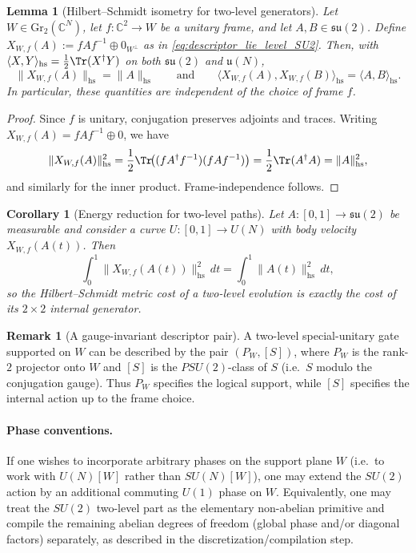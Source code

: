 \documentclass{article}%
\newtheorem{lemma}[theorem]{Lemma}
\newtheorem{corollary}[theorem]{Corollary}
\theoremstyle{definition}
\newtheorem{remark}[theorem]{Remark}
\numberwithin{equation}{section}
\newcommand{\C}{\mathbb{C}}
\newcommand{\Gr}{\mathrm{Gr}}
\begin{document}
\begin{lemma}[Hilbert--Schmidt isometry for two-level generators]
\label{lem:HS_norm_two_level_generator}
Let $W\in\Gr_2(\C^N)$, let $f:\C^2\to W$ be a unitary frame, and let $A,B\in\mathfrak{su}(2)$.
Define $X_{W,f}(A):=fAf^{-1}\oplus 0_{W^\perp}$ as in \eqref{eq:descriptor_lie_level_SU2}. Then, with
$\langle X,Y\rangle_{\mathrm{hs}}=\tfrac12\Tr(X^\dagger Y)$ on both $\mathfrak{su}(2)$ and
$\mathfrak{u}(N)$,
\begin{equation}\label{eq:HS_norm_preservation}
\|X_{W,f}(A)\|_{\mathrm{hs}}=\|A\|_{\mathrm{hs}}
\qquad\text{and}\qquad
\langle X_{W,f}(A),X_{W,f}(B)\rangle_{\mathrm{hs}}=\langle A,B\rangle_{\mathrm{hs}}.
\end{equation}
In particular, these quantities are independent of the choice of frame $f$.
\end{lemma}

\begin{proof}
Since $f$ is unitary, conjugation preserves adjoints and traces. Writing
$X_{W,f}(A)=fAf^{-1}\oplus 0$, we have
\[
\|X_{W,f}(A)\|_{\mathrm{hs}}^2
=\frac12\Tr\!\big((fA^\dagger f^{-1})(fAf^{-1})\big)
=\frac12\Tr(A^\dagger A)
=\|A\|_{\mathrm{hs}}^2,
\]
and similarly for the inner product. Frame-independence follows.
\end{proof}

\begin{corollary}[Energy reduction for two-level paths]\label{cor:energy_reduction_two_level}
Let $A:[0,1]\to\mathfrak{su}(2)$ be measurable and consider a curve $U:[0,1]\to U(N)$ with body
velocity $X_{W,f}(A(t))$. Then
\[
\int_0^1\|X_{W,f}(A(t))\|_{\mathrm{hs}}^2\,dt
=\int_0^1\|A(t)\|_{\mathrm{hs}}^2\,dt,
\]
so the Hilbert--Schmidt metric cost of a two-level evolution is exactly the cost of its
$2\times 2$ internal generator.
\end{corollary}

\begin{remark}[A gauge-invariant descriptor pair]\label{rem:gauge_invariant_descriptor_pair}
A two-level special-unitary gate supported on $W$ can be described by the pair $(P_W,[S])$, where
$P_W$ is the rank-$2$ projector onto $W$ and $[S]$ is the $PSU(2)$-class of $S$ (i.e.\ $S$ modulo the
conjugation gauge). Thus $P_W$ specifies the logical support, while $[S]$ specifies the internal
action up to the frame choice.
\end{remark}

\paragraph{Phase conventions.}
If one wishes to incorporate arbitrary phases on the support plane $W$ (i.e.\ to work with $U(N)[W]$
rather than $SU(N)[W]$), one may extend the $SU(2)$ action by an additional commuting $U(1)$ phase on
$W$. Equivalently, one may treat the $SU(2)$ two-level part as the elementary non-abelian primitive
and compile the remaining abelian degrees of freedom (global phase and/or diagonal factors)
separately, as described in the discretization/compilation step.
\end{document}
